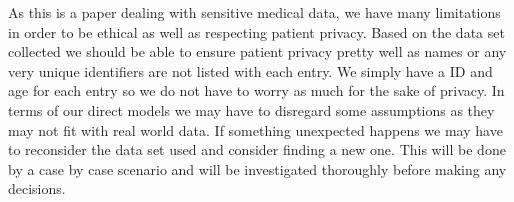 \documentclass[12pt]{article}
\begin{document}
As this is a paper dealing with sensitive medical data, we have many limitations in order to be ethical as well as respecting patient privacy. Based on the data set collected we should be able to ensure patient privacy pretty well as names or any very unique identifiers are not listed with each entry. We simply have a ID and age for each entry so we do not have to worry as much for the sake of privacy. In terms of our direct models we may have to disregard some assumptions as they may not fit with real world data. If something unexpected happens we may have to reconsider the data set used and consider finding a new one. This will be done by a case by case scenario and will be investigated thoroughly before making any decisions. 



\end{document}
